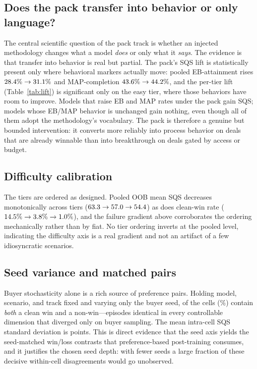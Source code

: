 \subsection{Does the pack transfer into behavior or only language?}
The central scientific question of the pack track is whether an injected
methodology changes what a model \emph{does} or only what it \emph{says}. The
evidence is that transfer into behavior is real but partial. The pack's SQS lift is
statistically present only where behavioral markers actually move: pooled
EB-attainment rises $28.4\%\to31.1\%$ and MAP-completion $43.6\%\to44.2\%$, and the
per-tier lift (Table~\ref{tab:lift}) is significant only on the easy tier, where
those behaviors have room to improve. Models that raise EB and MAP rates under the
pack gain SQS; models whose EB/MAP behavior is unchanged gain nothing, even though
all of them adopt the methodology's vocabulary. The pack is therefore a genuine but
bounded intervention: it converts more reliably into process behavior on deals that
are already winnable than into breakthrough on deals gated by access or budget.

\subsection{Difficulty calibration}
The tiers are ordered as designed. Pooled OOB mean SQS decreases monotonically
across tiers ($63.3\to57.0\to54.4$) as does clean-win
rate ($14.5\%\to3.8\%\to1.0\%$),
and the failure gradient above corroborates the ordering mechanically rather than by
fiat. No tier ordering inverts at the pooled level, indicating the difficulty axis is
a real gradient and not an artifact of a few idiosyncratic scenarios.

\subsection{Seed variance and matched pairs}
Buyer stochasticity alone is a rich source of preference pairs. Holding model,
scenario, and track fixed and varying only the buyer seed, \resSeedMixedCells{} of
the \resSeedCells{} cells
(\resSeedMixedPct{}\%) contain \emph{both} a clean win and a non-win---episodes identical in
every controllable dimension that diverged only on buyer sampling. The mean
intra-cell SQS standard deviation is \resSeedIntraSD{} points. This is direct evidence that the
seed axis yields the seed-matched win/loss contrasts that preference-based
post-training consumes, and it justifies the chosen seed depth: with fewer seeds a
large fraction of these decisive within-cell disagreements would go unobserved.

